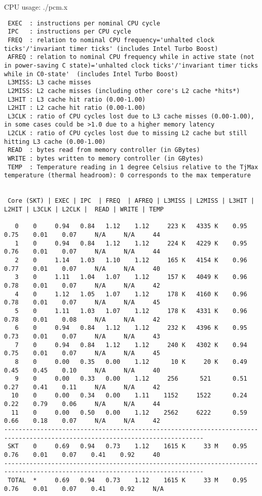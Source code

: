 CPU usage: ./pcm.x
\begin{lstlisting}
 EXEC  : instructions per nominal CPU cycle
 IPC   : instructions per CPU cycle
 FREQ  : relation to nominal CPU frequency='unhalted clock ticks'/'invariant timer ticks' (includes Intel Turbo Boost)
 AFREQ : relation to nominal CPU frequency while in active state (not in power-saving C state)='unhalted clock ticks'/'invariant timer ticks while in C0-state'  (includes Intel Turbo Boost)
 L3MISS: L3 cache misses 
 L2MISS: L2 cache misses (including other core's L2 cache *hits*) 
 L3HIT : L3 cache hit ratio (0.00-1.00)
 L2HIT : L2 cache hit ratio (0.00-1.00)
 L3CLK : ratio of CPU cycles lost due to L3 cache misses (0.00-1.00), in some cases could be >1.0 due to a higher memory latency
 L2CLK : ratio of CPU cycles lost due to missing L2 cache but still hitting L3 cache (0.00-1.00)
 READ  : bytes read from memory controller (in GBytes)
 WRITE : bytes written to memory controller (in GBytes)
 TEMP  : Temperature reading in 1 degree Celsius relative to the TjMax temperature (thermal headroom): 0 corresponds to the max temperature


 Core (SKT) | EXEC | IPC  | FREQ  | AFREQ | L3MISS | L2MISS | L3HIT | L2HIT | L3CLK | L2CLK |  READ | WRITE | TEMP

   0    0     0.94   0.84   1.12    1.12     223 K   4335 K    0.95    0.75    0.01    0.07     N/A     N/A     44
   1    0     0.94   0.84   1.12    1.12     224 K   4229 K    0.95    0.76    0.01    0.07     N/A     N/A     44
   2    0     1.14   1.03   1.10    1.12     165 K   4154 K    0.96    0.77    0.01    0.07     N/A     N/A     40
   3    0     1.11   1.04   1.07    1.12     157 K   4049 K    0.96    0.78    0.01    0.07     N/A     N/A     42
   4    0     1.12   1.05   1.07    1.12     178 K   4160 K    0.96    0.78    0.01    0.07     N/A     N/A     45
   5    0     1.11   1.03   1.07    1.12     178 K   4331 K    0.96    0.78    0.01    0.08     N/A     N/A     42
   6    0     0.94   0.84   1.12    1.12     232 K   4396 K    0.95    0.73    0.01    0.07     N/A     N/A     43
   7    0     0.94   0.84   1.12    1.12     240 K   4302 K    0.94    0.75    0.01    0.07     N/A     N/A     45
   8    0     0.00   0.35   0.00    1.12      10 K     20 K    0.49    0.45    0.45    0.10     N/A     N/A     40
   9    0     0.00   0.33   0.00    1.12     256      521      0.51    0.27    0.41    0.11     N/A     N/A     42
  10    0     0.00   0.34   0.00    1.11    1152     1522      0.24    0.22    0.79    0.06     N/A     N/A     44
  11    0     0.00   0.50   0.00    1.12    2562     6222      0.59    0.66    0.18    0.07     N/A     N/A     42
-----------------------------------------------------------------------------------------------------------------------------
 SKT    0     0.69   0.94   0.73    1.12    1615 K     33 M    0.95    0.76    0.01    0.07    0.41    0.92     40
-----------------------------------------------------------------------------------------------------------------------------
 TOTAL  *     0.69   0.94   0.73    1.12    1615 K     33 M    0.95    0.76    0.01    0.07    0.41    0.92     N/A
\end{lstlisting}

